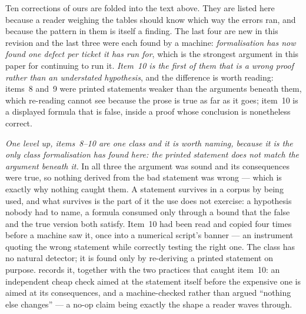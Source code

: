 \documentclass[11pt,a4paper]{article}
\theoremstyle{plain}
\theoremstyle{definition}
\theoremstyle{remark}
\newcommand{\file}[1]{\path{#1}}
\begin{document}
Ten corrections of ours are folded into the text above.  They are listed here
because a reader weighing the tables should know which way the errors ran, and
because the pattern in them is itself a finding.  The last four are new in this
revision and the last three were each found by a machine: \emph{formalisation has
now found one defect per ticket it has run for}, which is the strongest argument
in this paper for continuing to run it.  \emph{Item~10 is the first of them that
is a wrong proof rather than an understated hypothesis}, and the difference is
worth reading: items~8 and~9 were printed statements weaker than the arguments
beneath them, which re-reading cannot see because the prose is true as far as it
goes; item~10 is a displayed formula that is false, inside a proof whose
conclusion is nonetheless correct.

\emph{One level up, items~8--10 are one class and it is worth naming, because it
is the only class formalisation has found here: the printed statement does not
match the argument beneath it.}  In all three the argument was sound and its
consequences were true, so nothing derived from the bad statement was wrong ---
which is exactly why nothing caught them.  A statement survives in a corpus by
being used, and what survives is the part of it the use does not exercise: a
hypothesis nobody had to name, a formula consumed only through a bound that the
false and the true version both satisfy.  Item~10 had been read and copied four
times before a machine saw it, once into a numerical script's banner --- an
instrument quoting the wrong statement while correctly testing the right one.
The class has no natural detector; it is found only by re-deriving a printed
statement on purpose.  \file{notes/statement-defects.md} records it, together
with the two practices that caught item~10: an independent cheap check aimed at
the statement itself before the expensive one is aimed at its consequences, and a
machine-checked rather than argued ``nothing else changes'' --- a no-op claim
being exactly the shape a reader waves through.
\end{document}

